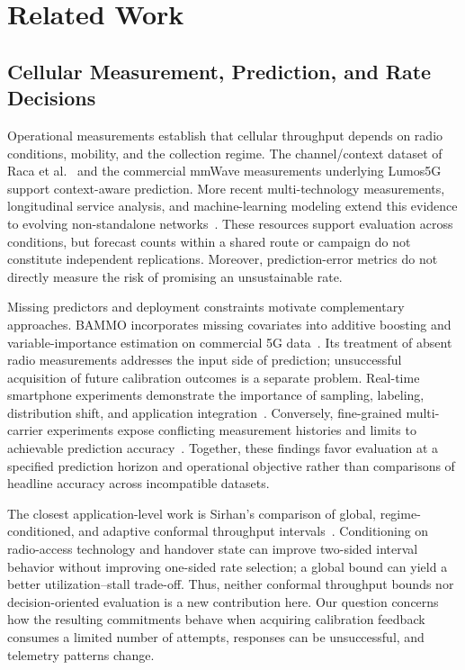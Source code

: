 \section{Related Work}
\label{sec:related_work}

\subsection{Cellular Measurement, Prediction, and Rate Decisions}
Operational measurements establish that cellular throughput depends on radio conditions, mobility, and the collection regime. The channel/context dataset of Raca et al.~\cite{raca2020} and the commercial mmWave measurements underlying Lumos5G~\cite{narayanan2020} support context-aware prediction. More recent multi-technology measurements, longitudinal service analysis, and machine-learning modeling extend this evidence to evolving non-standalone networks~\cite{kousias2024data,caso2024,kousias2024model}. These resources support evaluation across conditions, but forecast counts within a shared route or campaign do not constitute independent replications. Moreover, prediction-error metrics do not directly measure the risk of promising an unsustainable rate.

Missing predictors and deployment constraints motivate complementary approaches. BAMMO incorporates missing covariates into additive boosting and variable-importance estimation on commercial 5G data~\cite{jacobson2025}. Its treatment of absent radio measurements addresses the input side of prediction; unsuccessful acquisition of future calibration outcomes is a separate problem. Real-time smartphone experiments demonstrate the importance of sampling, labeling, distribution shift, and application integration~\cite{raca2024}. Conversely, fine-grained multi-carrier experiments expose conflicting measurement histories and limits to achievable prediction accuracy~\cite{basit2024}. Together, these findings favor evaluation at a specified prediction horizon and operational objective rather than comparisons of headline accuracy across incompatible datasets.

The closest application-level work is Sirhan's comparison of global, regime-conditioned, and adaptive conformal throughput intervals~\cite{sirhan2026}. Conditioning on radio-access technology and handover state can improve two-sided interval behavior without improving one-sided rate selection; a global bound can yield a better utilization--stall trade-off. Thus, neither conformal throughput bounds nor decision-oriented evaluation is a new contribution here. Our question concerns how the resulting commitments behave when acquiring calibration feedback consumes a limited number of attempts, responses can be unsuccessful, and telemetry patterns change.

